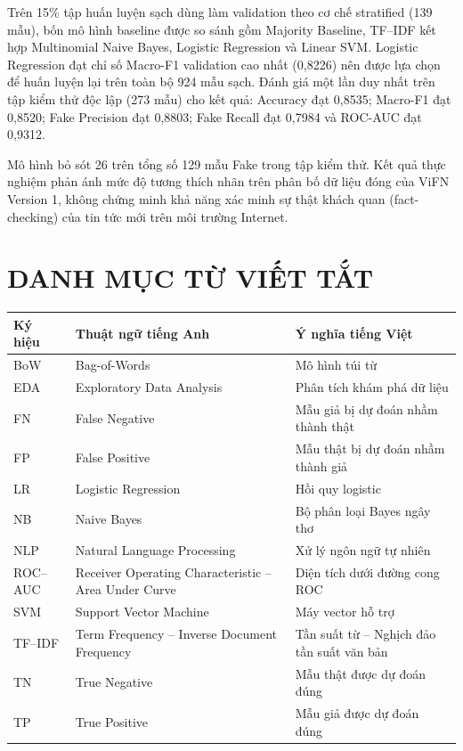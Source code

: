 \documentclass[12pt,a4paper]{report}
\begin{document}
Trên 15\% tập huấn luyện sạch dùng làm validation theo cơ chế stratified (139 mẫu), bốn mô hình baseline được so sánh gồm Majority Baseline, TF--IDF kết hợp Multinomial Naive Bayes, Logistic Regression và Linear SVM. Logistic Regression đạt chỉ số Macro-F1 validation cao nhất (0,8226) nên được lựa chọn để huấn luyện lại trên toàn bộ 924 mẫu sạch. Đánh giá một lần duy nhất trên tập kiểm thử độc lập (273 mẫu) cho kết quả: Accuracy đạt 0,8535; Macro-F1 đạt 0,8520; Fake Precision đạt 0,8803; Fake Recall đạt 0,7984 và ROC-AUC đạt 0,9312. 

Mô hình bỏ sót 26 trên tổng số 129 mẫu Fake trong tập kiểm thử. Kết quả thực nghiệm phản ánh mức độ tương thích nhãn trên phân bố dữ liệu đóng của ViFN Version 1, không chứng minh khả năng xác minh sự thật khách quan (fact-checking) của tin tức mới trên môi trường Internet.

\clearpage

\chapter*{DANH MỤC TỪ VIẾT TẮT}
\begin{table}[H]
\centering
\begin{tabularx}{\textwidth}{l p{5cm} X}
\toprule
\textbf{Ký hiệu} & \textbf{Thuật ngữ tiếng Anh} & \textbf{Ý nghĩa tiếng Việt} \\
\midrule
BoW & Bag-of-Words & Mô hình túi từ \\
EDA & Exploratory Data Analysis & Phân tích khám phá dữ liệu \\
FN & False Negative & Mẫu giả bị dự đoán nhầm thành thật \\
FP & False Positive & Mẫu thật bị dự đoán nhầm thành giả \\
LR & Logistic Regression & Hồi quy logistic \\
NB & Naive Bayes & Bộ phân loại Bayes ngây thơ \\
NLP & Natural Language Processing & Xử lý ngôn ngữ tự nhiên \\
ROC--AUC & Receiver Operating Characteristic -- Area Under Curve & Diện tích dưới đường cong ROC \\
SVM & Support Vector Machine & Máy vector hỗ trợ \\
TF--IDF & Term Frequency -- Inverse Document Frequency & Tần suất từ -- Nghịch đảo tần suất văn bản \\
TN & True Negative & Mẫu thật được dự đoán đúng \\
TP & True Positive & Mẫu giả được dự đoán đúng \\
\bottomrule
\end{tabularx}
\end{table}
\end{document}
